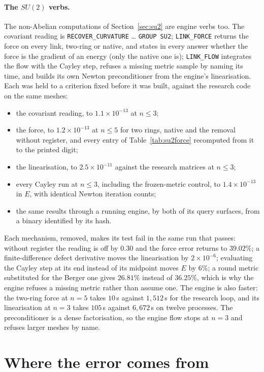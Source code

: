 \documentclass[11pt]{article}
\theoremstyle{definition}
\theoremstyle{remark}
\begin{document}
\paragraph{The $SU(2)$ verbs.} The non-Abelian computations of Section~\ref{sec:su2} are engine
verbs too. The covariant reading is
\texttt{RECOVER\_CURVATURE} \dots{} \texttt{GROUP SU2}; \texttt{LINK\_FORCE} returns the force on every link, two-ring or native, and
states in every answer whether the force is the gradient of an energy (only the native one is);
\texttt{LINK\_FLOW} integrates the flow with the Cayley step, refuses a missing metric sample by
naming its time, and builds its own Newton preconditioner from the engine's linearisation. Each
was held to a criterion fixed before it was built, against the research code on the same meshes:
\begin{itemize}
  \item the covariant reading, to $1.1\times10^{-13}$ at $n\le3$;
  \item the force, to $1.2\times10^{-13}$ at $n\le5$ for two rings, native and the removal without
    register, and every entry of Table~\ref{tab:su2force} recomputed from it to the printed digit;
  \item the linearisation, to $2.5\times10^{-11}$ against the research matrices at $n\le3$;
  \item every Cayley run at $n\le3$, including the frozen-metric control, to $1.4\times10^{-13}$
    in $E$, with identical Newton iteration counts;
  \item the same results through a running engine, by both of its query surfaces, from a binary
    identified by its hash.
\end{itemize}
Each mechanism, removed, makes its test fail in the same run that passes: without register the
reading is off by $0.30$ and the force error returns to $39.02\%$; a finite-difference defect
derivative moves the linearisation by $2\times10^{-6}$; evaluating the Cayley step at its end
instead of its midpoint moves $E$ by $6\%$; a round metric substituted for the Berger one gives
$26.81\%$ instead of $36.25\%$, which is why the engine refuses a missing metric rather than
assume one. The engine is also faster: the two-ring force at $n=5$ takes $10$\,s against
$1{,}512$\,s for the research loop, and its linearisation at $n=3$ takes $105$\,s against
$6{,}672$\,s on twelve processes. The preconditioner is a dense factorisation, so the engine flow
stops at $n=3$ and refuses larger meshes by name.

\section{Where the error comes from}\label{sec:decomp}
\end{document}
